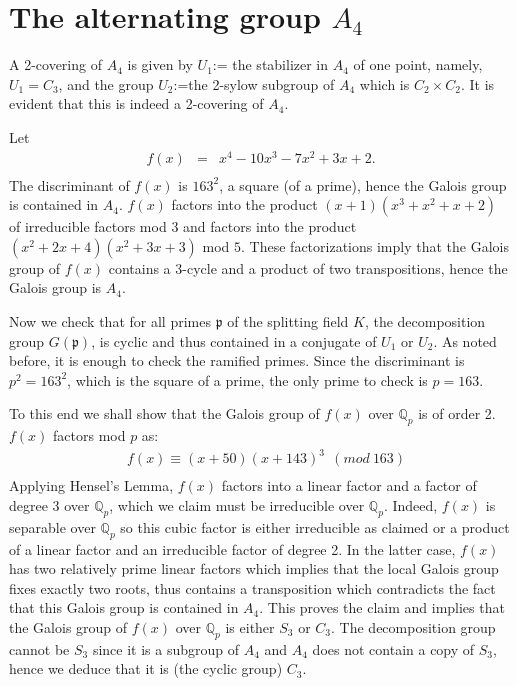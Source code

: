 \documentclass[reqno,12pt]{amsart}
\theoremstyle{remark}
\theoremstyle{definition}
\theoremstyle{citing}
\numberwithin{theorem}{section}
\numberwithin{equation}{section}
\begin{document}
\section{The alternating group $A_{4}$}

A 2-covering of $A_{4}$ is given by $U_{1}$:=
the stabilizer in $A_{4}$ of one point, namely, $U_{1}=C_{3}$, and
the group $U_{2}$:=the 2-sylow subgroup of $A_{4}$ which
is $C_{2}\times C_{2}$. It is evident that this is indeed a 2-covering
of $A_{4}$.

Let \begin{eqnarray*}
f(x) & = & x^{4}-10x^{3}-7x^{2}+3x+2.\\
\end{eqnarray*}
The discriminant
of $f(x)$ is $163^{2}$, a square (of a prime), hence the Galois
group is contained in $A_{4}$.
 $f(x)$ factors into the product
$(x+1)(x^{3}+x^{2}+x+2)$ of irreducible factors mod $3$ and factors
into the product $(x^{2}+2x+4)(x^{2}+3x+3)$ mod $5$. These factorizations
imply that the Galois group of $f(x)$ contains a 3-cycle and a product
of two transpositions, hence the Galois group is  $A_{4}$.

Now we  check  that for all primes
$\mathfrak{p}$ of the splitting field $K$, the decomposition group $G(\mathfrak{p})$,
is cyclic and thus contained in a conjugate of $U_{1}$ or $U_{2}$.
As noted before,  it is enough to check the ramified primes. Since the discriminant is $p^{2}=163^{2}$, which is the square of a prime, the only prime to check is $p=163$.

To this end we shall show that the
Galois group of $f(x)$ over $\mathbb{Q}_{p}$ is of order 2.   $f(x)$ factors mod $p$ as: \begin{eqnarray*}
 & f(x)\equiv(x+50)(x+143)^{3}\ \ (mod\ 163)\\
\end{eqnarray*}
Applying Hensel's Lemma, $f(x)$ factors into a linear
factor and a factor of degree 3 over $\mathbb{Q}_{p}$, which we claim must be irreducible over $\mathbb{Q}_{p}$.  Indeed,  $f(x)$ is
separable over $\mathbb{Q}_{p}$  so this cubic factor is either irreducible
as claimed or a product of a linear factor and an irreducible factor
of degree 2. In the latter case,  $f(x)$ has two relatively prime linear factors which implies that the local Galois group fixes exactly two roots, thus contains a transposition which contradicts
the fact that this Galois group is contained in $A_{4}$. This proves the claim and implies
that the Galois group of $f(x)$ over $\mathbb{Q}_{p}$ is either
$S_{3}$ or $C_{3}$. The decomposition group cannot be $S_{3}$ since
it is a subgroup of $A_{4}$ and $A_{4}$ does not contain a copy
of $S_{3}$, hence we deduce that it is (the cyclic group) $C_{3}$.
\end{document}
